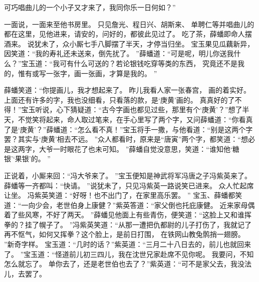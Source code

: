 可巧唱曲儿的一个小子又才来了，我同你乐一日何如？”\par
一面说，一面来至他书房里。
只见詹光、程日兴、胡斯来、
单聘仁等并唱曲儿的都在这里，见他进来，请安的，问好的，都彼此见过了。
吃了茶，薛蟠即命人摆酒来。
说犹未了，众小厮七手八脚摆了半天，才停当归坐。
宝玉果见瓜藕新异，因笑道：“我的寿礼还未送来，倒先扰了。
”薛蟠道：“可是呢，明儿你送我什么？”宝玉道：“我可有什么可送的？若论银钱吃穿等类的东西， 
究竟还不是我的，惟有或写一张字，画一张画，才算是我的。
”\par
薛蟠笑道：“你提画儿，我才想起来了。
昨儿我看人家一张春宫，
画的着实好。
上面还有许多的字，我也没细看，只看落的款，是‘庚黄’画的。
真真好的了不得！”宝玉听说，心下猜疑道：“古今字画也都见过些，那里有个‘庚黄’？”想了半天，不觉笑将起来，命人取过笔来，在手心里写了两个字，又问薛蟠道：“你看真了是‘庚黄’？”薛蟠道：“怎么看不真！”宝玉将手一撒，与他看道：“别是这两个字罢？其实与‘庚黄’相去不远。
”众人都看时，原来是“唐寅”两个字，都笑道：“想必是这两字，大爷一时眼花了也未可知。
”薛蟠自觉没意思，笑道：“谁知他‘糖银’‘果银’的。
”\par
正说着，小厮来回：“冯大爷来了。
”宝玉便知是神武将军冯唐之子冯紫英来了。
薛蟠等一齐都叫：“快请。
”说犹未了，只见冯紫英一路说笑已进来。
众人忙起席让坐。
冯紫英笑道：“好呀！也不出门了，在家里高乐罢。
” 
宝玉、薛蟠都笑道：“一向少会，老世伯身上康健？”紫英答道：“家父倒也托庇康健。
近来家母偶着了些风寒，不好了两天。
”薛蟠见他面上有些青伤，便笑道：“这脸上又和谁挥拳的？挂了幌子了。
”冯紫英笑道：“从那一遭把仇都尉的儿子打伤了，我就记了再不怄气，如何又挥拳？这个脸上，是前日打围，
在铁网山教兔鹘捎一翅膀。
”新奇字样。
宝玉道：“几时的话？”紫英道：“三月二十八日去的，前儿也就回来了。
”宝玉道：“怪道前儿初三四儿，我在沈世兄家赴席不见你呢。
我要问，不知怎么就忘了。
单你去了，还是老世伯也去了？”紫英道：“可不是家父去，我没法儿，去罢了。

